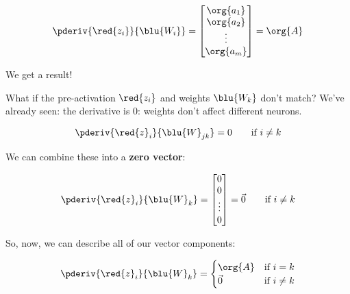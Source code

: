         \begin{equation}
            \pderiv{ \red{z_i} }{  \blu{W_{i}} } =
            \begin{bmatrix}
                \org{a_1}
                \\
                \org{a_2}
                \\
                \vdots
                \\
                \org{a_m}
            \end{bmatrix}
            =
            \org{A}
        \end{equation}
        
        We get a result!
        
        \subsecdiv
        
        What if the pre-activation $\red{z_i}$ and weights $\blu{W_{k}}$ don't match? We've already seen: the derivative is 0: weights don't affect different neurons.
        
        \begin{equation}
            \pderiv{ \red{z}_i }{ \blu{W}_{jk} } = 0 
            \qquad
            \text{if } i \neq k
        \end{equation}
        
        We can combine these into a \textbf{zero vector}:
        
        \begin{equation}
            \pderiv{ \red{z}_i }{ \blu{W}_{k} } = 
            \begin{bmatrix}
                0\\0\\ \vdots \\ 0
            \end{bmatrix}
            =
            \vec{0}
            \qquad
            \text{if } i \neq k
        \end{equation}
        
        So, now, we can describe all of our vector components:
        
        \begin{equation}
            \pderiv{ \red{z}_i }{ \blu{W}_{k} } = 
            \begin{cases}
              \org{A} & \text{if } i = k\\
              \vec{0} & \text{if } i \neq k
            \end{cases}
        \end{equation}
        
